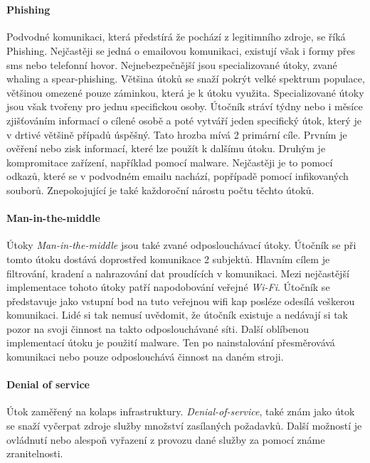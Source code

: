 ~\label{fig:MaliciousGoverments}

\paragraph{Phishing}
Podvodné komunikaci, která předstírá že pochází z legitimního zdroje, se říká Phishing\cite{cisco_most_common_attack}.
Nejčastěji se jedná o emailovou komunikaci, existují však i formy přes sms nebo telefonní hovor.
Nejnebezpečnější jsou specializované útoky, zvané whaling a spear-phishing.
Většina útoků se snaží pokrýt velké spektrum populace, většinou omezené pouze záminkou, která je k útoku využita.
Specializované útoky jsou však tvořeny pro jednu specifickou osoby.
Útočník stráví týdny nebo i měsíce zjišťováním informací o cílené osobě a poté vytváří jeden specifický útok, který je v drtivé většině případů úspěšný.
Tato hrozba mívá 2 primární cíle.
Prvním je ověření nebo zisk informací, které lze použít k dalšímu útoku.
Druhým je kompromitace zařízení, například pomocí malware.
Nejčastěji je to pomocí odkazů, které se v podvodném emailu nachází, popřípadě pomocí infikovaných souborů.
Znepokojující je také každoroční nárostu počtu těchto útoků.\cite{moje_bakalarka}

\paragraph{Man-in-the-middle}
Útoky \textit{Man-in-the-middle} jsou také zvané odposlouchávací útoky.
Útočník se při tomto útoku dostává doprostřed komunikace 2 subjektů.
Hlavním cílem je filtrování, kradení a nahrazování dat proudících v komunikaci.
Mezi nejčastější implementace tohoto útoky patří napodobování veřejné \textit{Wi-Fi}.
Útočník se představuje jako vstupní bod na tuto veřejnou wifi kap posléze odesílá veškerou komunikaci.
Lidé si tak nemusí uvědomit, že útočník existuje a nedávají si tak pozor na svoji činnost na takto odposlouchávané síti.
Další oblíbenou implementací útoku je použití malware.
Ten po nainstalování přesměrovává komunikaci nebo pouze odposlouchává činnost na daném stroji.\cite{cisco_most_common_attack}

\paragraph{Denial of service}
Útok zaměřený na kolaps infrastruktury.
\textit{Denial-of-service}, také znám jako  útok se snaží vyčerpat zdroje služby množství zasílaných požadavků.
Další možností je ovládnutí nebo alespoň vyřazení z provozu dané služby za pomocí známe zranitelnosti.\cite{cisco_most_common_attack}


